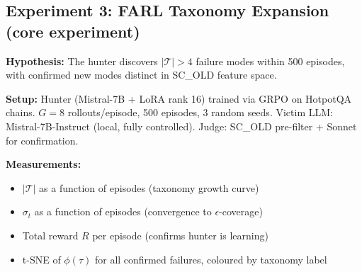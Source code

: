 \documentclass[11pt,a4paper]{article}
\begin{document}
\begin{table}[h]
\centering\small
{}
\caption{Bootstrap CI results (2,000 resamples). MiniJudge achieves
precision 1.000 on HotpotQA at FPR $\leq 10\%$ with a tight CI,
confirming alert-level predictions are reliable when confidence is high.
SC\_OLD precision CIs are wide on small $n$ due to few wrong-chain
examples; this motivates TriviaQA $n=1000$ as the primary evaluation set.}
\label{tab:bootstrap}
\end{table}

\subsection{Experiment 3: FARL Taxonomy Expansion (core experiment)}

\textbf{Hypothesis:} The hunter discovers $|\mathcal{T}| > 4$ failure modes
within 500 episodes, with confirmed new modes distinct in SC\_OLD feature space.

\textbf{Setup:} Hunter (Mistral-7B + LoRA rank 16) trained via GRPO on
HotpotQA chains. $G=8$ rollouts/episode, 500 episodes, 3 random seeds.
Victim LLM: Mistral-7B-Instruct (local, fully controlled).
Judge: SC\_OLD pre-filter + Sonnet for confirmation.

\textbf{Measurements:}
\begin{itemize}
  \item $|\mathcal{T}|$ as a function of episodes (taxonomy growth curve)
  \item $\sigma_t$ as a function of episodes (convergence to $\epsilon$-coverage)
  \item Total reward $R$ per episode (confirms hunter is learning)
  \item t-SNE of $\phi(\tau)$ for all confirmed failures, coloured by taxonomy label
\end{itemize}
\end{document}
